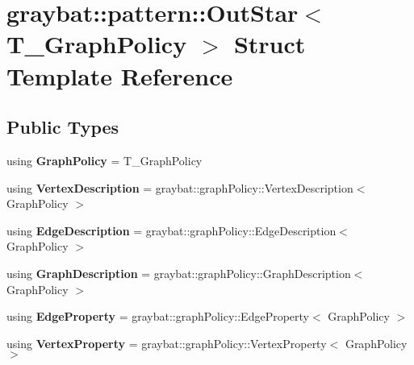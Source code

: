 \hypertarget{structgraybat_1_1pattern_1_1OutStar}{}\section{graybat\+:\+:pattern\+:\+:Out\+Star$<$ T\+\_\+\+Graph\+Policy $>$ Struct Template Reference}
\label{structgraybat_1_1pattern_1_1OutStar}
\subsection*{Public Types}
\begin{DoxyCompactItemize}
\item 
\hypertarget{structgraybat_1_1pattern_1_1OutStar_a80ba60b631ad3cd3708037cab7a11614}{}using {\bfseries Graph\+Policy} = T\+\_\+\+Graph\+Policy\label{structgraybat_1_1pattern_1_1OutStar_a80ba60b631ad3cd3708037cab7a11614}

\item 
\hypertarget{structgraybat_1_1pattern_1_1OutStar_a69113e42104417cbe81906ee0d575796}{}using {\bfseries Vertex\+Description} = graybat\+::graph\+Policy\+::\+Vertex\+Description$<$ Graph\+Policy $>$\label{structgraybat_1_1pattern_1_1OutStar_a69113e42104417cbe81906ee0d575796}

\item 
\hypertarget{structgraybat_1_1pattern_1_1OutStar_a751930588a07e1e5a000601011dad5e7}{}using {\bfseries Edge\+Description} = graybat\+::graph\+Policy\+::\+Edge\+Description$<$ Graph\+Policy $>$\label{structgraybat_1_1pattern_1_1OutStar_a751930588a07e1e5a000601011dad5e7}

\item 
\hypertarget{structgraybat_1_1pattern_1_1OutStar_aa22b54720d47f626b00ea3e20711da7b}{}using {\bfseries Graph\+Description} = graybat\+::graph\+Policy\+::\+Graph\+Description$<$ Graph\+Policy $>$\label{structgraybat_1_1pattern_1_1OutStar_aa22b54720d47f626b00ea3e20711da7b}

\item 
\hypertarget{structgraybat_1_1pattern_1_1OutStar_a529cb17a9c89354e71f18ec03e2c691f}{}using {\bfseries Edge\+Property} = graybat\+::graph\+Policy\+::\+Edge\+Property$<$ Graph\+Policy $>$\label{structgraybat_1_1pattern_1_1OutStar_a529cb17a9c89354e71f18ec03e2c691f}

\item 
\hypertarget{structgraybat_1_1pattern_1_1OutStar_a04d362d67a1249cf237b57ad78e66f71}{}using {\bfseries Vertex\+Property} = graybat\+::graph\+Policy\+::\+Vertex\+Property$<$ Graph\+Policy $>$\label{structgraybat_1_1pattern_1_1OutStar_a04d362d67a1249cf237b57ad78e66f71}

\end{DoxyCompactItemize}
